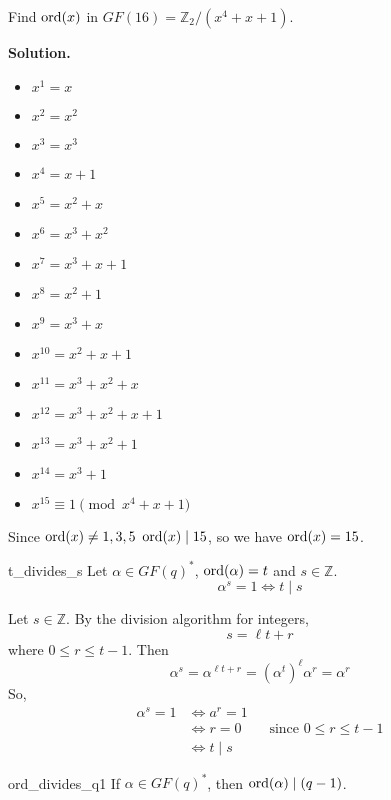 \begin{Example}{}{}
    Find $ \operatorname{ord}(x) $ in $ GF(16)=\mathbb{Z}_2/(x^4+x+1) $.

    \textbf{Solution.}
    \begin{itemize}
        \item $ x^1=x $
        \item $ x^2=x^2 $
        \item $ x^3=x^3 $
        \item $ x^4=x+1 $
        \item $ x^5=x^2+x $
        \item $ x^6=x^3+x^2 $
        \item $ x^7=x^3+x+1 $
        \item $ x^8=x^2+1 $
        \item $ x^9=x^3+x $
        \item $ x^{10}=x^2+x+1 $
        \item $ x^{11}=x^3+x^2+x $
        \item $ x^{12}=x^3+x^2+x+1 $
        \item $ x^{13}=x^3+x^2+1 $
        \item $ x^{14}=x^3+1 $
        \item $ x^{15}\equiv 1\pmod{x^4+x+1} $
    \end{itemize}
    Since $ \operatorname{ord}(x)\neq 1,3,5 $ $ \operatorname{ord}(x)\mid 15 $, so we have $ \operatorname{ord}(x)=15 $.
\end{Example}

\begin{Lemma}{}{t_divides_s}
    Let $ \alpha\in GF(q)^* $, $ \operatorname{ord}(\alpha)=t $ and $ s\in\mathbb{Z} $.
    \[ \alpha^s=1\iff t\mid s \]
\end{Lemma}

\begin{Proof}{}{}
    Let $ s\in\mathbb{Z} $. By the division algorithm for integers,
    \[ s=\ell t+r \]
    where $ 0\leqslant r\leqslant t-1 $. Then
    \[ \alpha^s=\alpha^{\ell t+r}=(\alpha^t)^\ell \alpha^r=\alpha^r \]
    So,
    \begin{align*}
        \alpha^s=1 & \iff a^r=1                                             \\
                   & \iff r=0 \qquad\text{since } 0\leqslant r\leqslant t-1 \\
                   & \iff t\mid s
    \end{align*}
\end{Proof}

\begin{Corollary}{}{ord_divides_q1}
    If $ \alpha\in GF(q)^* $, then $ \operatorname{ord}(\alpha)\mid (q-1) $.
\end{Corollary}

